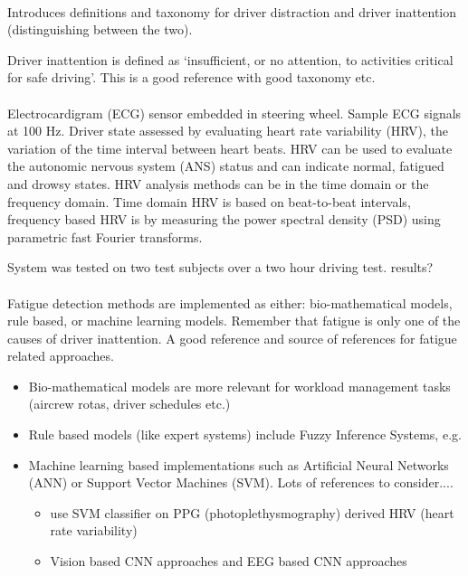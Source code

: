 \documentclass[11pt, parskip=half*,twoside=false]{scrbook}
\begin{document}
\paragraph{\citep{reganDriverDistractionDriver2011}} Introduces definitions and taxonomy for driver distraction and driver inattention (distinguishing between the two).

Driver inattention is defined as `insufficient, or no attention, to activities critical for safe driving'. This is a good reference with good taxonomy etc.



\paragraph{\citep{jungDriverFatigueDrowsiness2014}} Electrocardigram (ECG) sensor embedded in steering wheel. Sample ECG signals at 100 Hz. Driver state assessed by evaluating heart rate variability (HRV), the variation of the time interval between heart beats. HRV can be used to evaluate the autonomic nervous system (ANS) status and can indicate normal, fatigued and drowsy states. HRV analysis methods can be in the time domain or the frequency domain. Time domain HRV is based on beat-to-beat intervals, frequency based HRV is by measuring the power spectral density (PSD) using parametric fast Fourier transforms.

System was tested on two test subjects over a two hour driving test. results?

\paragraph{\citep{sikanderDriverFatigueDetection2019}} Fatigue detection methods are implemented as either: bio-mathematical models, rule based, or machine learning models. Remember that fatigue is only one of the causes of driver inattention.  A good reference and source of references for fatigue related approaches.

\begin{itemize}
	\item Bio-mathematical models are more relevant for workload management tasks (aircrew rotas, driver schedules etc.)
	\item Rule based models (like expert systems) include Fuzzy Inference Systems, e.g. \citep{aksjonovDetectionEvaluationDriver2019}
	\item Machine learning based implementations such as Artificial Neural Networks (ANN) or Support Vector Machines (SVM). Lots of references to consider....
	\begin{itemize}
		\item \citet{liDetectionDriverDrowsiness2013} use SVM classifier on PPG (photoplethysmography) derived HRV (heart rate variability)
		\item Vision based CNN approaches \citep{yuDriverDrowsinessDetection2019} and EEG based CNN approaches \citep{gaoEEGBasedSpatioTemporal2019}
	\end{itemize}
\end{itemize}
\end{document}
